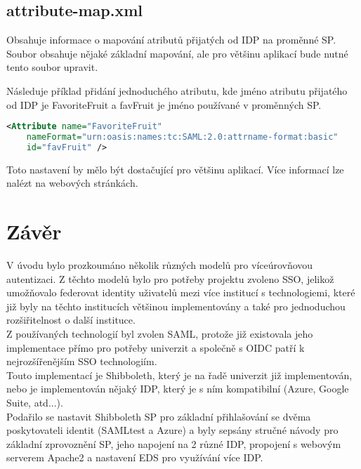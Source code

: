 \section{attribute-map.xml}
Obsahuje informace o mapování atributů přijatých od IDP na proměnné SP. Soubor obsahuje nějaké základní mapování, ale pro většinu aplikací bude nutné tento soubor upravit.

Následuje příklad přidání jednoduchého atributu, kde jméno atributu přijatého od IDP je FavoriteFruit a favFruit je jméno používané v proměnných SP\cite{AddAttribute}.
 \begin{lstlisting}[language=XML]
     <Attribute name="FavoriteFruit"
    nameFormat="urn:oasis:names:tc:SAML:2.0:attrname-format:basic"
    id="favFruit" />
    \end{lstlisting}
    
Toto nastavení by mělo být dostačující pro většinu aplikací. Více informací lze nalézt na webových stránkách\cite{AddAttribute}.

\chapter{Závěr}
V úvodu bylo prozkoumáno několik různých modelů pro víceúrovňovou autentizaci. Z těchto modelů bylo pro potřeby projektu zvoleno SSO, jelikož umožňovalo federovat identity uživatelů mezi více institucí s technologiemi, které již byly na těchto institucích většinou implementovány a také pro jednoduchou rozšiřitelnost o další instituce. 
\\
Z používaných technologií byl zvolen SAML, protože již existovala jeho implementace přímo pro potřeby univerzit a společně s OIDC patří k nejrozšířenějším SSO technologiím. \\
Touto implementací je Shibboleth, který je na řadě univerzit již implementován, nebo je implementován nějaký IDP, který je s ním kompatibilní (Azure, Google Suite, atd...).\\
Podařilo se nastavit Shibboleth SP pro základní přihlašování se dvěma poskytovateli identit (SAMLtest a Azure) a byly sepsány stručné návody pro základní zprovoznění SP, jeho napojení na 2 různé IDP, propojení s webovým serverem Apache2 a nastavení EDS pro využívání více IDP.

\label{zaver}






